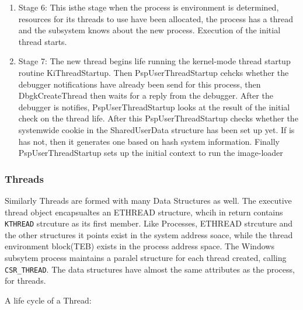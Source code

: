 \documentclass[letterpaper,10pt,draftclsnofoot,onecolumn]{IEEEtran}
\begin{document}
\begin{enumerate}
\item Stage 6: This isthe stage when the process is environment is determined, resources for its threads to use have been allocated, the process has a thread and the subsystem knows about the new process. Execution of the initial thread starts.
\item Stage 7: The new thread begins life running the kernel-mode thread startup routine KiThreadStartup. Then PspUserThreadStartup cehcks whether the debugger notifications have already been send for this process, then DbgkCreateThread then waits for a reply from the debugger. After the debugger is notifies, PspUserThreadStartup looks at the result of the initial check on the thread life. After this PspUserThreadStartup checks whether the systemwide cookie in the SharedUserData structure has been set up yet. If is has not, then it generates one based on hash system information. Finally PspUserThreadStartup sets up the initial context to run the image-loader\cite{[1]}\\
\end{enumerate}
\subsubsection*{Threads}

Similarly Threads are formed with many Data Structures as well. The executive thread object encapsualtes an ETHREAD structure, whcih in return contains \verb|KTHREAD| strcuture as its first member. Like Processes, ETHREAD strcuture and the other structures it points exist in the system address soace, while the thread environment block(TEB) exists in the process address space. The Windows subsytem process maintains a paralel structure for each thread created, calling \verb|CSR_THREAD|. The data structures have almost the same attributes as the process, for threads.

A life cycle of a Thread:
\end{document}

